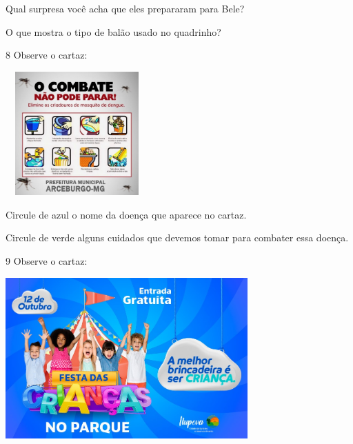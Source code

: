 \begin{escolha}
\item Qual surpresa você acha que eles prepararam para Bele?


\item O que mostra o tipo de balão usado no quadrinho?

\end{escolha}

\num{8} Observe o cartaz:

\includegraphics[width=2.15306in,height=1.86730in]{media/image134.jpeg}


\begin{escolha}
\item Circule de azul o nome da doença que aparece no cartaz.

\item Circule de verde alguns cuidados que devemos tomar para combater essa doença.
\end{escolha}

\num{9} Observe o cartaz:

\includegraphics[width=3.66026in,height=2.43572in]{media/image135.jpeg}



